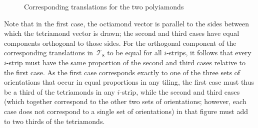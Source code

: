 \begin{figure}[htp!]
\begin{center}
\end{center}
\caption{Corresponding translations for the two polyiamonds}
\label{fig:kitetrans}
\end{figure}

Note that in the first case, the octiamond vector is parallel to the
sides between which the tetriamond vector is drawn; the second and
third cases have equal components orthogonal to those sides.  For the
orthogonal component of the corresponding translations
in~$\mathcal{T}_8$ to be equal for all $i$-strips, it follows that
every $i$-strip must have the same proportion of the second and third
cases relative to the first case.  As the first case corresponds
exactly to one of the three sets of orientations that occur in equal
proportions in any tiling, the first case must thus be a third of the
tetriamonds in any $i$-strip, while the second and third cases (which
together correspond to the other two sets of orientations; however,
each case does not correspond to a single set of orientations) in that
figure must add to two thirds of the tetriamonds.

